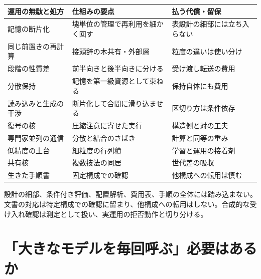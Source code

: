 \documentclass[lualatex,a4paper,10pt]{jlreq}
\begin{document}
\begin{center}
\small
\begin{tabularx}{\textwidth}{@{}p{}p{}X@{}}
\toprule
運用の無駄と処方 & 仕組みの要点 & 払う代償・留保 \\
\midrule
記憶の断片化 & 塊単位の管理で再利用を細かく回す & 表設計の細部には立ち入らない \\
同じ前置きの再計算 & 接頭辞の木共有・外部層 & 粒度の違いは使い分け \\
段階の性質差 & 前半向きと後半向きに分ける & 受け渡し転送の費用 \\
分散保持 & 記憶を第一級資源として束ねる & 保持自体にも費用 \\
読み込みと生成の干渉 & 断片化して合間に滑り込ませる & 区切り方は条件依存 \\
復号の核 & 圧縮注意に寄せた実行 & 構造側と対の工夫 \\
専門家並列の通信 & 分散と結合のさばき & 計算と同等の重み \\
低精度の土台 & 細粒度の行列積 & 学習と運用の接着剤 \\
共有核 & 複数技法の同居 & 世代差の吸収 \\
生きた手順書 & 固定構成での確認 & 他構成への転用は慎む \\
\bottomrule
\end{tabularx}
\end{center}
\autocite{pagedattn,sglang,splitwise,mooncake,sarathi,flashmla}

\begin{claimboundary}[本節の読解上の境界]
設計の細部、条件付き評価、配置解析、費用表、手順の全体には踏み込まない。文書の対応は特定構成での確認に留まり、他構成への転用はしない。合成的な受け入れ確認は測定として扱い、実運用の拒否動作と切り分ける。
\end{claimboundary}

\section{「大きなモデルを毎回呼ぶ」必要はあるか}
\label{sec:routing}
\end{document}
